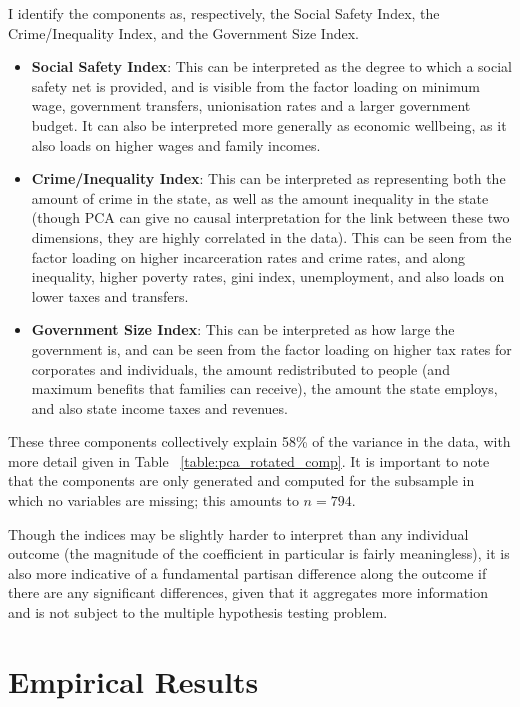 \documentclass{article}
\begin{document}
I identify the components as, respectively, the Social Safety Index, the Crime/Inequality Index, and the Government Size Index. 

\begin{itemize}
\item \textbf{Social Safety Index}: This can be interpreted as the degree to which a social safety net is provided, and is visible from the factor loading on minimum wage, government transfers, unionisation rates and a larger government budget. It can also be interpreted more generally as economic wellbeing, as it also loads on higher wages and family incomes.

\item \textbf{Crime/Inequality Index}: This can be interpreted as representing both the amount of crime in the state, as well as the amount inequality in the state (though PCA can give no causal interpretation for the link between these two dimensions, they are highly correlated in the data). This can be seen from the factor loading on higher incarceration rates and crime rates, and along inequality, higher poverty rates, gini index, unemployment, and also loads on lower taxes and transfers.

\item \textbf{Government Size Index}: This can be interpreted as how large the government is, and can be seen from the factor loading on higher tax rates for corporates and individuals, the amount redistributed to people (and maximum benefits that families can receive), the amount the state employs, and also state income taxes and revenues.
\end{itemize} 

These three components collectively explain 58\% of the variance in the data, with more detail given in Table ~\ref{table:pca_rotated_comp}. It is important to note that the components are only generated and computed for the subsample in which no variables are missing; this amounts to $n = 794$.

Though the indices may be slightly harder to interpret than any individual outcome (the magnitude of the coefficient in particular is fairly meaningless), it is also more indicative of a fundamental partisan difference along the outcome if there are any significant differences, given that it aggregates more information and is not subject to the multiple hypothesis testing problem.

\section{Empirical Results}
\end{document}
